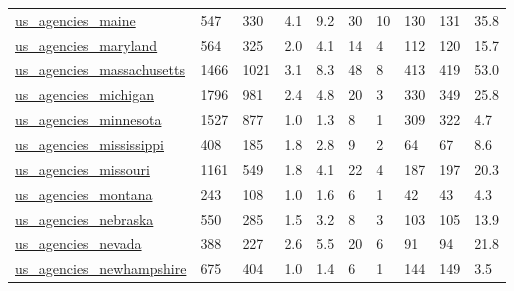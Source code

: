 \begin{longtable}{llllllllll}
 \href{http://govmaps.cid.hks.harvard.edu}{us\_agencies\_maine}                                                               & 547        & 330   & 4.1    & 9.2    & 30    & 10     & 130    & 131    & 35.8    \\
 \href{http://govmaps.cid.hks.harvard.edu}{us\_agencies\_maryland}                                                            & 564        & 325   & 2.0    & 4.1    & 14    & 4      & 112    & 120    & 15.7    \\
 \href{http://govmaps.cid.hks.harvard.edu}{us\_agencies\_massachusetts}                                                       & 1466       & 1021  & 3.1    & 8.3    & 48    & 8      & 413    & 419    & 53.0    \\
 \href{http://govmaps.cid.hks.harvard.edu}{us\_agencies\_michigan}                                                            & 1796       & 981   & 2.4    & 4.8    & 20    & 3      & 330    & 349    & 25.8    \\
 \href{http://govmaps.cid.hks.harvard.edu}{us\_agencies\_minnesota}                                                           & 1527       & 877   & 1.0    & 1.3    & 8     & 1      & 309    & 322    & 4.7     \\
 \href{http://govmaps.cid.hks.harvard.edu}{us\_agencies\_mississippi}                                                         & 408        & 185   & 1.8    & 2.8    & 9     & 2      & 64     & 67     & 8.6     \\
 \href{http://govmaps.cid.hks.harvard.edu}{us\_agencies\_missouri}                                                            & 1161       & 549   & 1.8    & 4.1    & 22    & 4      & 187    & 197    & 20.3    \\
 \href{http://govmaps.cid.hks.harvard.edu}{us\_agencies\_montana}                                                             & 243        & 108   & 1.0    & 1.6    & 6     & 1      & 42     & 43     & 4.3     \\
 \href{http://govmaps.cid.hks.harvard.edu}{us\_agencies\_nebraska}                                                            & 550        & 285   & 1.5    & 3.2    & 8     & 3      & 103    & 105    & 13.9    \\
 \href{http://govmaps.cid.hks.harvard.edu}{us\_agencies\_nevada}                                                              & 388        & 227   & 2.6    & 5.5    & 20    & 6      & 91     & 94     & 21.8    \\
 \href{http://govmaps.cid.hks.harvard.edu}{us\_agencies\_newhampshire}                                                        & 675        & 404   & 1.0    & 1.4    & 6     & 1      & 144    & 149    & 3.5     \\

\end{longtable}
